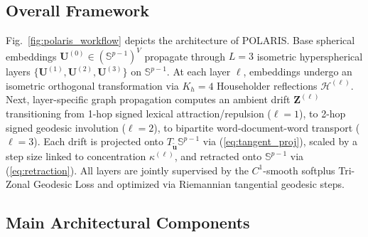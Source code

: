 \documentclass[journal]{IEEEtran}
\begin{document}
\subsection{Overall Framework}
Fig.~\ref{fig:polaris_workflow} depicts the architecture of POLARIS. Base spherical embeddings $\mathbf{U}^{(0)} \in (\mathbb{S}^{p-1})^V$ propagate through $L = 3$ isometric hyperspherical layers $\{\mathbf{U}^{(1)}, \mathbf{U}^{(2)}, \mathbf{U}^{(3)}\}$ on $\mathbb{S}^{p-1}$. At each layer $\ell$, embeddings undergo an isometric orthogonal transformation via $K_h = 4$ Householder reflections $\mathcal{H}^{(\ell)}$. Next, layer-specific graph propagation computes an ambient drift $\mathbf{Z}^{(\ell)}$ transitioning from 1-hop signed lexical attraction/repulsion ($\ell = 1$), to 2-hop signed geodesic involution ($\ell = 2$), to bipartite word-document-word transport ($\ell = 3$). Each drift is projected onto $T_{\tilde{\mathbf{u}}}\mathbb{S}^{p-1}$ via (\ref{eq:tangent_proj}), scaled by a step size linked to concentration $\kappa^{(\ell)}$, and retracted onto $\mathbb{S}^{p-1}$ via (\ref{eq:retraction}). All layers are jointly supervised by the $C^1$-smooth softplus Tri-Zonal Geodesic Loss and optimized via Riemannian tangential geodesic steps.

\subsection{Main Architectural Components}
\end{document}
